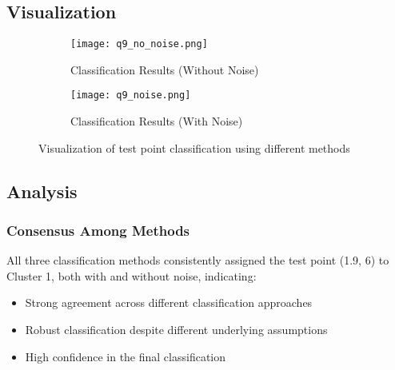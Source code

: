 \documentclass[12pt]{article}
\begin{document}
\subsection{Visualization}
\begin{figure}[H]
    \centering
    \begin{subfigure}[b]{0.48\textwidth}
        \texttt{[image: q9\_no\_noise.png]}
        \caption{Classification Results (Without Noise)}
    \end{subfigure}
    \hfill
    \begin{subfigure}[b]{0.48\textwidth}
        \texttt{[image: q9\_noise.png]}
        \caption{Classification Results (With Noise)}
    \end{subfigure}
    \caption{Visualization of test point classification using different methods}
\end{figure}

\subsection{Analysis}

\subsubsection{Consensus Among Methods}
All three classification methods consistently assigned the test point (1.9, 6) to Cluster 1, both with and without noise, indicating:
\begin{itemize}
    \item Strong agreement across different classification approaches
    \item Robust classification despite different underlying assumptions
    \item High confidence in the final classification
\end{itemize}
\end{document}
